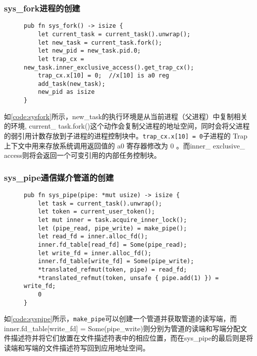 \subsubsection{sys\_fork进程的创建}
\begin{figure}[h]
\begin{lstlisting}[caption=sys\_fork的系统调用, label=code:sysfork]
pub fn sys_fork() -> isize {
    let current_task = current_task().unwrap();
    let new_task = current_task.fork();
    let new_pid = new_task.pid.0;
    let trap_cx = new_task.inner_exclusive_access().get_trap_cx();
    trap_cx.x[10] = 0;  //x[10] is a0 reg
    add_task(new_task);
    new_pid as isize
}
\end{lstlisting}
\end{figure}

如\autoref{code:sysfork}所示，new\_task的执行环境是从当前进程（父进程）中复制相关的环境, current\_ task.fork()这个动作会复制父进程的地址空间，同时会将父进程的弱引用计数存放到子进程的进程控制块中。\verb|trap_cx.x[10] = 0|子进程的 Trap 上下文中用来存放系统调用返回值的 a0 寄存器修改为 0 。而inner\_ exclusive\_ access则将会返回一个可变引用的内部任务控制块。
\subsubsection{sys\_pipe通信媒介管道的创建}
\begin{figure}[h]
\begin{lstlisting}[caption=sys\_pipe的系统调用, label=code:syspipe]
pub fn sys_pipe(pipe: *mut usize) -> isize {
    let task = current_task().unwrap();
    let token = current_user_token();
    let mut inner = task.acquire_inner_lock();
    let (pipe_read, pipe_write) = make_pipe();
    let read_fd = inner.alloc_fd();
    inner.fd_table[read_fd] = Some(pipe_read);
    let write_fd = inner.alloc_fd();
    inner.fd_table[write_fd] = Some(pipe_write);
    *translated_refmut(token, pipe) = read_fd;
    *translated_refmut(token, unsafe { pipe.add(1) }) = write_fd;
    0
} 
\end{lstlisting}
\end{figure}

如\autoref{code:syspipe}所示，\verb|make_pipe|可以创建一个管道并获取管道的读写端，而inner.fd\_table[write\_fd] = Some(pipe\_write)则分别为管道的读端和写端分配文件描述符并将它们放置在文件描述符表中的相应位置，而在sys\_pipe的最后则是将读端和写端的文件描述符写回到应用地址空间。

